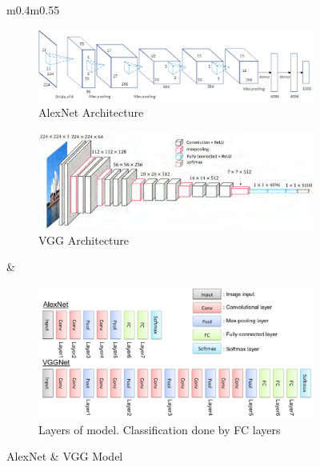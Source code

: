 \begin{figure}[h!]
	\centering
	\begin{tabular}[!ht]{m{0.4\hsize}m{0.55\hsize}}
		\begin{subfigure}[b]{\linewidth}
			\centering
			\includegraphics[width=0.9\linewidth]{Images/AlexNet_3D}
			\caption{AlexNet Architecture}
		\end{subfigure}
		
		\begin{subfigure}[b]{\linewidth}
			\centering
			\includegraphics[width=0.9\linewidth]{Images/VGG_3D}
			\caption{VGG Architecture}
		\end{subfigure}
	
		& 
		\begin{subfigure}[b]{\linewidth}
			\centering
			\includegraphics[width=\linewidth]{Images/AlexNet-and-VGGNet-architecture}
			\caption{Layers of model. Classification done by FC layers}
		\end{subfigure}
	\end{tabular}
	\caption{AlexNet \& VGG Model}	
	\label{fig:alexnet_vgg}
\end{figure}

